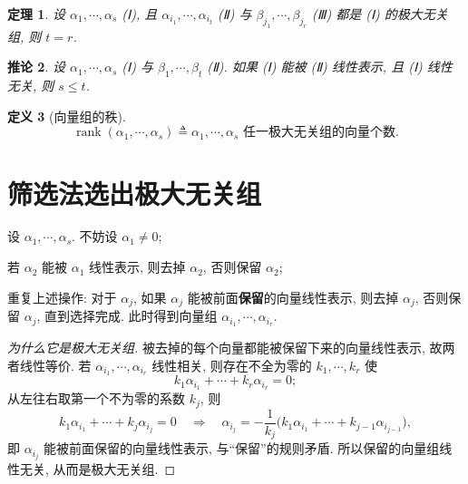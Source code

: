 \documentclass[UTF8,11pt]{ctexart}
\theoremstyle{cnthm}
\newtheorem{thm}{定理}[section]
\newtheorem{cor}[thm]{推论}
\newtheorem{defn}[thm]{定义}
\begin{document}
\begin{thm}
设 $\alpha_1,\cdots,\alpha_s$ (Ⅰ), 且 $\alpha_{i_1},\cdots,\alpha_{i_t}$ (Ⅱ) 与 $\beta_{j_1},\cdots,\beta_{j_r}$ (Ⅲ) 都是 (Ⅰ) 的极大无关组, 则 $t=r$.
\end{thm}

\begin{cor}
设 $\alpha_1,\cdots,\alpha_s$ (Ⅰ) 与 $\beta_1,\cdots,\beta_t$ (Ⅱ). 如果 (Ⅰ) 能被 (Ⅱ) 线性表示, 且 (Ⅰ) 线性无关, 则 $s\leq t$.
\end{cor}

\begin{defn}[向量组的秩]
\[
\operatorname{rank}(\alpha_1,\cdots,\alpha_s)\triangleq \alpha_1,\cdots,\alpha_s \text{ 任一极大无关组的向量个数}.
\]
\end{defn}

\section{筛选法选出极大无关组}

设 $\alpha_1,\cdots,\alpha_s$. 不妨设 $\alpha_1\neq0$;

若 $\alpha_2$ 能被 $\alpha_1$ 线性表示, 则去掉 $\alpha_2$, 否则保留 $\alpha_2$;

重复上述操作: 对于 $\alpha_j$, 如果 $\alpha_j$ 能被前面\textbf{保留}的向量线性表示, 则去掉 $\alpha_j$, 否则保留 $\alpha_j$, 直到选择完成. 此时得到向量组 $\alpha_{i_1},\cdots,\alpha_{i_r}$.

\begin{proof}[为什么它是极大无关组]
被去掉的每个向量都能被保留下来的向量线性表示, 故两者线性等价. 若 $\alpha_{i_1},\cdots,\alpha_{i_r}$ 线性相关, 则存在不全为零的 $k_1,\cdots,k_r$ 使
\[
k_1\alpha_{i_1}+\cdots+k_r\alpha_{i_r}=0 ;
\]
从左往右取第一个不为零的系数 $k_j$, 则
\[
k_1\alpha_{i_1}+\cdots+k_j\alpha_{i_j}=0
\quad\Longrightarrow\quad
\alpha_{i_j}=-\frac{1}{k_j}\bigl(k_1\alpha_{i_1}+\cdots+k_{j-1}\alpha_{i_{j-1}}\bigr),
\]
即 $\alpha_{i_j}$ 能被前面保留的向量线性表示, 与``保留''的规则矛盾. 所以保留的向量组线性无关, 从而是极大无关组.
\end{proof}
\end{document}
